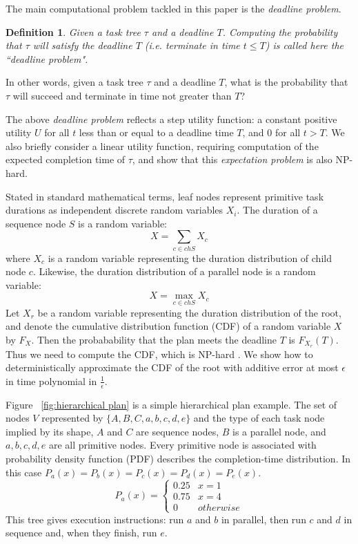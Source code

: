 \documentclass{article}
\newtheorem{definition}{Definition}
\begin{document}
The main computational problem tackled in this paper is the {\em deadline problem}. 
\begin{definition}\label{Def:Deadline}
	Given a task tree $\tau $ and a deadline $T$. 
	Computing the probability that $\tau $ will satisfy the deadline $T$ 
(i.e. terminate in time $t \leq T$) is called here the ``deadline problem".
\end{definition}
In other words, given a task tree $\tau $ and a deadline $T$, what is the probability that $\tau $ 
will succeed and terminate in time not greater than $T$? 

The above {\em deadline problem} reflects a step utility function: a 
constant positive utility $U$ for all $t$ less than or equal to a deadline 
time $T$, and $0$ for all $t>T$. We also briefly consider a linear utility function, requiring
computation of the expected completion time of $\tau$, and show that this {\em expectation problem} 
is also NP-hard.

Stated in standard mathematical terms, leaf nodes represent primitive task durations as
independent discrete random variables $X_i$. The duration of a sequence node $S$ is a random
variable:
\[
X = \sum_{c\in ch{S}} X_c
\]
where $X_c$ is a random variable representing the duration distribution of child node $c$.
Likewise, the duration distribution of a parallel node is a random variable:
\[
X = \max_{c\in ch{S}} X_c
\]
Let $X_r$ be a random variable representing the duration distribution of the root,
and denote the cumulative distribution function (CDF) of a random variable $X$ by $F_X$. Then
the probabability that the plan meets the deadline $T$ is $F_{X_r}(T)$.
Thus we need to compute the CDF, which is NP-hard \cite{}. We show how
to deterministically approximate the CDF of the root with additive error at most $\epsilon $
in time polynomial in $\frac{1}{\epsilon}$.

Figure ~\ref{fig:hierarchical plan} is a simple hierarchical plan example. The set of nodes $ V$ represented by $\lbrace A,B,C,a,b,c,d,e \rbrace $ and the type of each task node implied by its shape, $A$ and $C$ are sequence nodes, $ B $ is a parallel node, and $ a, b, c, d, e $ are all primitive nodes. Every primitive node is associated with probability density function (PDF) describes the completion-time distribution. In this case $P_a(x)=P_b(x)=P_c(x)=P_d(x)=P_e(x)$.
$$P_a(x)=
\begin{cases}
0.25 & x=1 \\
0.75 & x=4 \\
0 & otherwise
\end{cases}$$
This tree gives execution instructions: run $a$ and $b$ in parallel, then run $c$ and $d$ in sequence and, when they finish, run $e$.
\end{document}
